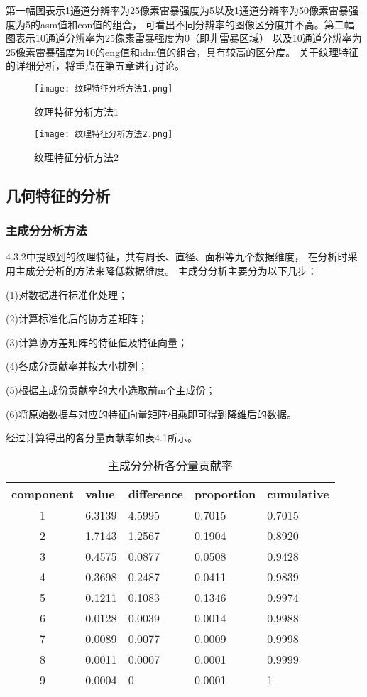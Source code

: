 第一幅图表示1通道分辨率为25像素雷暴强度为5以及1通道分辨率为50像素雷暴强度为5的asm值和con值的组合，
可看出不同分辨率的图像区分度并不高。第二幅图表示10通道分辨率为25像素雷暴强度为0（即非雷暴区域）
以及10通道分辨率为25像素雷暴强度为10的eng值和idm值的组合，具有较高的区分度。
关于纹理特征的详细分析，将重点在第五章进行讨论。

\begin{figure}[htbp]
\centering
\begin{minipage}[t]{0.48\textwidth}
\centering
\texttt{[image: 纹理特征分析方法1.png]}
\caption{纹理特征分析方法1}
\end{minipage}
\begin{minipage}[t]{0.48\textwidth}
\centering
\texttt{[image: 纹理特征分析方法2.png]}
\caption{纹理特征分析方法2}
\end{minipage}
\end{figure}
    
\subsection{几何特征的分析}
\subsubsection{主成分分析方法}
4.3.2中提取到的纹理特征，共有周长、直径、面积等九个数据维度，
在分析时采用主成分分析的方法来降低数据维度。
主成分分析主要分为以下几步：

(1)对数据进行标准化处理；

(2)计算标准化后的协方差矩阵；

(3)计算协方差矩阵的特征值及特征向量；

(4)各成分贡献率并按大小排列；

(5)根据主成份贡献率的大小选取前m个主成份；

(6)将原始数据与对应的特征向量矩阵相乘即可得到降维后的数据。

经过计算得出的各分量贡献率如表4.1所示。

\begin{table}[htb]
    \centering\small
    \caption{主成分分析各分量贡献率}
    \label{tab:exampletable}
    \begin{tabular}{cllll}
      \toprule
        component & value & difference  & proportion & cumulative    \\
      \midrule
      1 & 6.3139 & 4.5995 & 0.7015 & 0.7015 \\
      2 & 1.7143 & 1.2567 & 0.1904 & 0.8920 \\
      3 & 0.4575 & 0.0877 & 0.0508 & 0.9428 \\
      4 & 0.3698 & 0.2487 & 0.0411 & 0.9839 \\
      5 & 0.1211 & 0.1083 & 0.1346 & 0.9974 \\
      6 & 0.0128 & 0.0039 & 0.0014 & 0.9988 \\
      7 & 0.0089 & 0.0077 & 0.0009 & 0.9998 \\
      8 & 0.0011 & 0.0007 & 0.0001 & 0.9999 \\
      9 & 0.0004 & 0 & 0.0001 &  1\\
      \bottomrule
    \end{tabular}
  \end{table}

